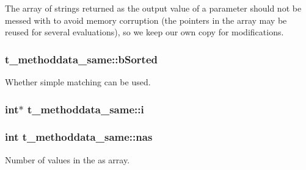 \-The array of strings returned as the output value of a parameter should not be messed with to avoid memory corruption (the pointers in the array may be reused for several evaluations), so we keep our own copy for modifications. \hypertarget{structt__methoddata__same_ab2deef5320393a530545e20eb358292f}{
\subsubsection[{b\-Sorted}]{ {\bf t\-\_\-methoddata\-\_\-same\-::b\-Sorted}}}\label{structt__methoddata__same_ab2deef5320393a530545e20eb358292f}
\-Whether simple matching can be used. \hypertarget{structt__methoddata__same_a041f9b3835ec6e385b114d41d98493a5}{
\subsubsection[{i}]{\setlength{\rightskip}{0pt plus 5cm}int$\ast$ {\bf t\-\_\-methoddata\-\_\-same\-::i}}}\label{structt__methoddata__same_a041f9b3835ec6e385b114d41d98493a5}
\hypertarget{structt__methoddata__same_a16929969cd1a689be049f6a02eecfb5d}{
\subsubsection[{nas}]{\setlength{\rightskip}{0pt plus 5cm}int {\bf t\-\_\-methoddata\-\_\-same\-::nas}}}\label{structt__methoddata__same_a16929969cd1a689be049f6a02eecfb5d}


\-Number of values in the {\ttfamily as} array. 

